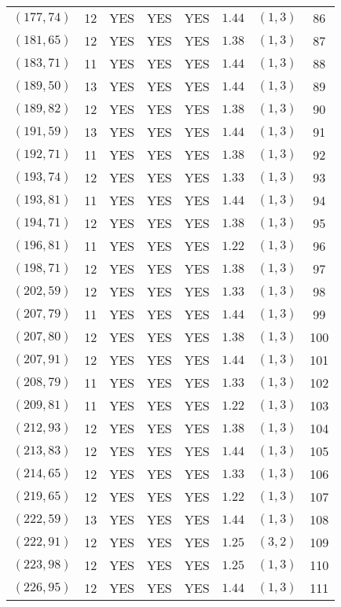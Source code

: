 \begin{longtable}{|c|c|c|c|c|c|c|c|}
$(177,74)$ & 12 & YES & YES & YES & $1.44$ & $(1,3)$ & 86\\
$(181,65)$ & 12 & YES & YES & YES & $1.38$ & $(1,3)$ & 87\\
$(183,71)$ & 11 & YES & YES & YES & $1.44$ & $(1,3)$ & 88\\
$(189,50)$ & 13 & YES & YES & YES & $1.44$ & $(1,3)$ & 89\\
$(189,82)$ & 12 & YES & YES & YES & $1.38$ & $(1,3)$ & 90\\
$(191,59)$ & 13 & YES & YES & YES & $1.44$ & $(1,3)$ & 91\\
$(192,71)$ & 11 & YES & YES & YES & $1.38$ & $(1,3)$ & 92\\
$(193,74)$ & 12 & YES & YES & YES & $1.33$ & $(1,3)$ & 93\\
$(193,81)$ & 11 & YES & YES & YES & $1.44$ & $(1,3)$ & 94\\
$(194,71)$ & 12 & YES & YES & YES & $1.38$ & $(1,3)$ & 95\\
$(196,81)$ & 11 & YES & YES & YES & $1.22$ & $(1,3)$ & 96\\
$(198,71)$ & 12 & YES & YES & YES & $1.38$ & $(1,3)$ & 97\\
$(202,59)$ & 12 & YES & YES & YES & $1.33$ & $(1,3)$ & 98\\
$(207,79)$ & 11 & YES & YES & YES & $1.44$ & $(1,3)$ & 99\\
$(207,80)$ & 12 & YES & YES & YES & $1.38$ & $(1,3)$ & 100\\
$(207,91)$ & 12 & YES & YES & YES & $1.44$ & $(1,3)$ & 101\\
$(208,79)$ & 11 & YES & YES & YES & $1.33$ & $(1,3)$ & 102\\
$(209,81)$ & 11 & YES & YES & YES & $1.22$ & $(1,3)$ & 103\\
$(212,93)$ & 12 & YES & YES & YES & $1.38$ & $(1,3)$ & 104\\
$(213,83)$ & 12 & YES & YES & YES & $1.44$ & $(1,3)$ & 105\\
$(214,65)$ & 12 & YES & YES & YES & $1.33$ & $(1,3)$ & 106\\
$(219,65)$ & 12 & YES & YES & YES & $1.22$ & $(1,3)$ & 107\\
$(222,59)$ & 13 & YES & YES & YES & $1.44$ & $(1,3)$ & 108\\
$(222,91)$ & 12 & YES & YES & YES & $1.25$ & $(3,2)$ & 109\\
$(223,98)$ & 12 & YES & YES & YES & $1.25$ & $(1,3)$ & 110\\
$(226,95)$ & 12 & YES & YES & YES & $1.44$ & $(1,3)$ & 111\\

\end{longtable}
